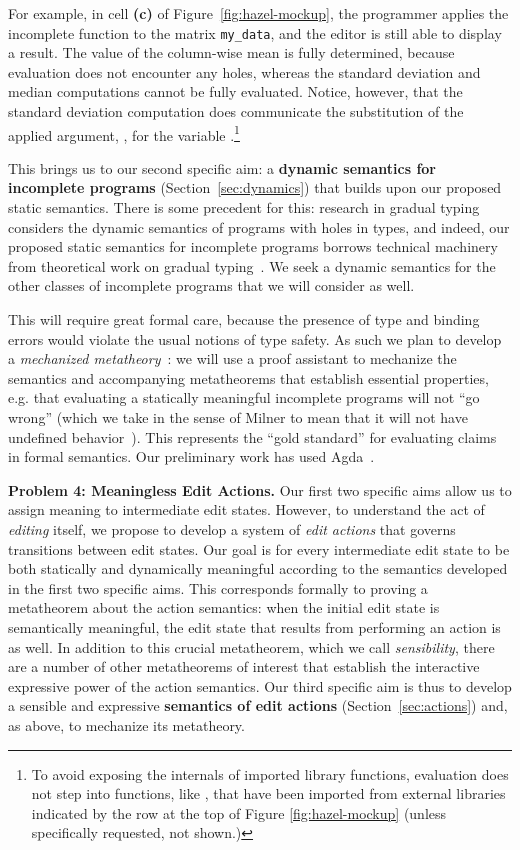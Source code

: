 For example, in cell \textbf{(c)} of Figure~\ref{fig:hazel-mockup}, the
programmer applies  the incomplete function  to 
the matrix \lstinline{my_data}, and 
the editor is still able to display a result.
The value of the column-wise mean is fully determined, because evaluation does
not encounter any holes, whereas the standard deviation and median computations
cannot be fully evaluated. Notice, however, that the standard
deviation computation does communicate the substitution of the applied argument,
, for the variable .\footnote{To avoid exposing the internals
of imported library functions, evaluation does not step into functions, like
, that have been imported from external libraries indicated by the row at the top of Figure \ref{fig:hazel-mockup} (unless specifically
requested, not shown.)}

This brings us to our second specific aim: a
\textbf{dynamic semantics for incomplete programs} (Section~\ref{sec:dynamics}) that builds upon our proposed
static semantics. There is some precedent for this: research in gradual typing
considers the dynamic semantics of programs with holes in types, and indeed, our
proposed static semantics for incomplete programs borrows technical machinery
from theoretical work on gradual typing~\cite{Siek06a}. We seek a dynamic semantics for the
other classes of incomplete programs that we will consider as well.

This will require great formal care, because the presence of type
and binding errors would violate the usual notions of type safety. As such we plan to develop a \emph{mechanized
  metatheory}~\cite{Lee:2007:TMM:1190216.1190245}: we will use a proof assistant to mechanize the semantics and
accompanying metatheorems that establish essential properties, e.g. that
evaluating a statically meaningful incomplete programs will not ``go wrong'' (which we take in
the sense of Milner to mean that it will not have undefined behavior~\cite{milner1978theory,pfpl}).
This represents the ``gold standard'' for evaluating claims in formal
semantics.  Our preliminary work has used Agda~\cite{norell2009dependently}.

\vspace{0.25ex}
\noindent\textbf{Problem 4: Meaningless Edit Actions.} Our first two specific aims
allow us to assign meaning to intermediate edit states. However, to
understand the act of \emph{editing} itself, we propose to develop a system of
\emph{edit actions} that governs transitions between edit
states. Our goal is for every intermediate edit state to be both statically and
dynamically meaningful according to the semantics developed in the first two
specific aims. This corresponds formally to proving a
metatheorem about the action semantics: when the initial edit state is
semantically meaningful, the edit state that results from performing an action
is as well. In addition to this crucial metatheorem, which
we call \emph{sensibility}, there are a number of other metatheorems of interest
that establish the interactive expressive power of the action semantics. Our third specific
aim is thus to develop a sensible and expressive \textbf{semantics of edit actions} (Section~\ref{sec:actions})
and, as above, to mechanize its metatheory.

